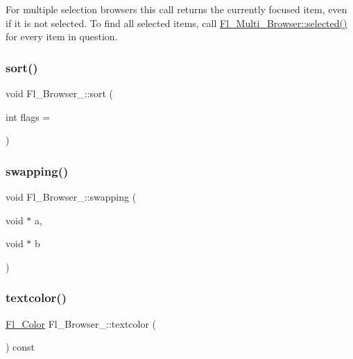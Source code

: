 For multiple selection browsers this call returns the currently focused item, even if it is not selected. To find all selected items, call \hyperlink{class_fl___browser_aca66dd0e41251d25abefbcff1602194d}{Fl\+\_\+\+Multi\+\_\+\+Browser\+::selected()} for every item in question. \mbox{\label{class_fl___browser___a852d20413fc81fd0be7c63408639974e}} 
\subsubsection{\texorpdfstring{sort()}{sort()}}
{\footnotesize\ttfamily void Fl\+\_\+\+Browser\+\_\+\+::sort (\begin{DoxyParamCaption}\item[{int}]{flags = {} }\end{DoxyParamCaption})}

\mbox{\label{class_fl___browser___ae1ae1e4627efd74f6dfc7c9116648a49}} 
\subsubsection{\texorpdfstring{swapping()}{swapping()}}
{\footnotesize\ttfamily void Fl\+\_\+\+Browser\+\_\+\+::swapping (\begin{DoxyParamCaption}\item[{void $\ast$}]{a,  }\item[{void $\ast$}]{b }\end{DoxyParamCaption})\hspace{0.3cm}{\ttfamily [protected]}}

\mbox{\label{class_fl___browser___a1a76a8e81183b02b45a669d8cfd3adeb}} 
\subsubsection{\texorpdfstring{textcolor()}{textcolor()}\hspace{0.1cm}{\footnotesize\ttfamily [1/2]}}
{\footnotesize\ttfamily \hyperlink{_enumerations_8_h_a8b762953646f8abee866061f1af78a6a}{Fl\+\_\+\+Color} Fl\+\_\+\+Browser\+\_\+\+::textcolor (\begin{DoxyParamCaption}{ }\end{DoxyParamCaption}) const\hspace{0.3cm}{\ttfamily [inline]}}

